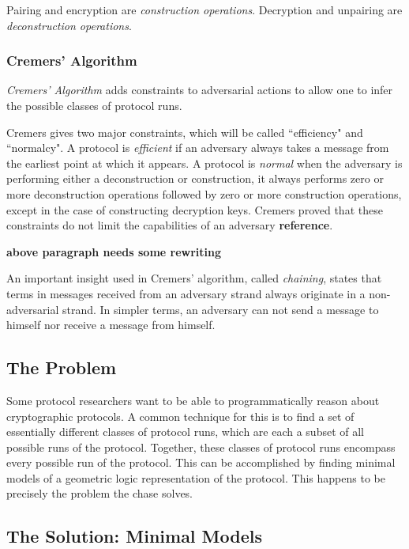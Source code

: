 				Pairing and encryption are \emph{construction operations}.
				Decryption and unpairing are \emph{deconstruction operations}.

		\subsubsection{Cremers' Algorithm}

			\emph{Cremers' Algorithm} adds constraints to adversarial actions
			to allow one to infer the possible classes of protocol runs.

			Cremers gives two major constraints, which will be called
			``efficiency" and ``normalcy". A protocol is \emph{efficient} if an
			adversary always takes a message from the earliest point at which
			it appears. A protocol is \emph{normal} when the adversary is
			performing either a deconstruction or construction, it always
			performs zero or more deconstruction operations followed by zero or
			more construction operations, except in the case of constructing
			decryption keys. Cremers proved that these constraints do not limit
			the capabilities of an adversary \textbf{reference}.

			\textbf{above paragraph needs some rewriting}

			An important insight used in Cremers' algorithm, called
			\emph{chaining}, states that terms in messages received from an
			adversary strand always originate in a non-adversarial strand. In
			simpler terms, an adversary can not send a message to himself nor
			receive a message from himself.

	\subsection{The Problem}

		Some protocol researchers want to be able to programmatically reason
		about cryptographic protocols. A common technique for this is to find a
		set of essentially different classes of protocol runs, which are each a
		subset of all possible runs of the protocol. Together, these classes of
		protocol runs encompass every possible run of the protocol. This can be
		accomplished by finding minimal models of a geometric logic
		representation of the protocol. This happens to be precisely the
		problem the chase solves.

	\subsection{The Solution: Minimal Models}

